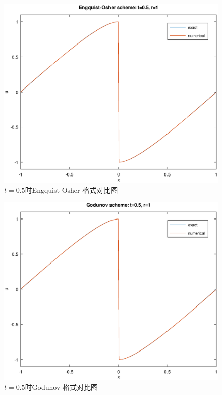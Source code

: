 \documentclass[a4paper, 12pt]{amsart}
\numberwithin{equation}{section}
\begin{document}
\begin{figure}[htbp]\centering
\includegraphics[width=\textwidth]{Engquist-Osher.eps}
\caption{$t=0.5$时Engquist-Osher 格式对比图}
\end{figure}

\begin{figure}[htbp]\centering
\includegraphics[width=\textwidth]{Godunov.eps}
\caption{$t=0.5$时Godunov 格式对比图}
\end{figure}
\end{document}
